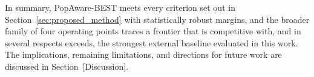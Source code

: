 \begin{table}[t]
\centering
\footnotesize
\caption{Best-observed-seed results (illustrative only; see caveat above). Not used for any
claim in this work.}
\label{tab:results-bestseed}
\end{table}

In summary, PopAware-BEST meets every criterion set out in Section~\ref{sec:proposed_method}
with statistically robust margins, and the broader family of four operating points traces a
frontier that is competitive with, and in several respects exceeds, the strongest external
baseline evaluated in this work. The implications, remaining limitations, and directions for
future work are discussed in Section~[Discussion].
